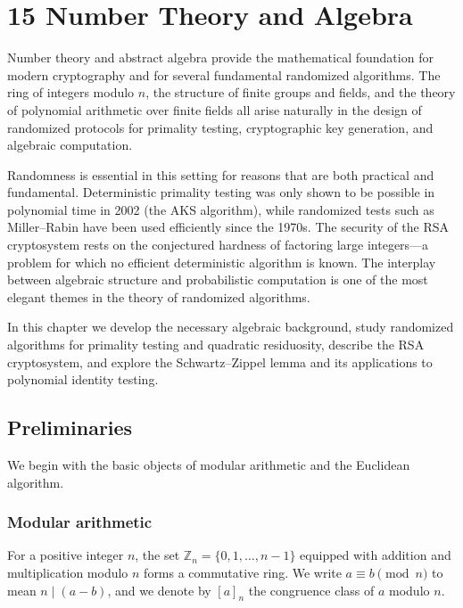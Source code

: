\documentclass[twoside,12pt]{book}
\theoremstyle{plain}
\theoremstyle{definition}
\theoremstyle{remark}
\begin{document}
\chapter*{15 Number Theory and Algebra}
\label{ch:number-theory}

Number theory and abstract algebra provide the mathematical foundation for modern cryptography and for several fundamental randomized algorithms. The ring of integers modulo $n$, the structure of finite groups and fields, and the theory of polynomial arithmetic over finite fields all arise naturally in the design of randomized protocols for primality testing, cryptographic key generation, and algebraic computation.

Randomness is essential in this setting for reasons that are both practical and fundamental. Deterministic primality testing was only shown to be possible in polynomial time in 2002 (the AKS algorithm), while randomized tests such as Miller--Rabin have been used efficiently since the 1970s. The security of the RSA cryptosystem rests on the conjectured hardness of factoring large integers---a problem for which no efficient deterministic algorithm is known. The interplay between algebraic structure and probabilistic computation is one of the most elegant themes in the theory of randomized algorithms.

In this chapter we develop the necessary algebraic background, study randomized algorithms for primality testing and quadratic residuosity, describe the RSA cryptosystem, and explore the Schwartz--Zippel lemma and its applications to polynomial identity testing.

\section{Preliminaries}
\label{sec:number-theory-prelim}

We begin with the basic objects of modular arithmetic and the Euclidean algorithm.

\subsection{Modular arithmetic}

For a positive integer $n$, the set $\mathbb{Z}_n = \{0, 1, \ldots, n-1\}$ equipped with addition and multiplication modulo $n$ forms a commutative ring. We write $a \equiv b \pmod{n}$ to mean $n \mid (a - b)$, and we denote by $[a]_n$ the congruence class of $a$ modulo $n$.
\end{document}
